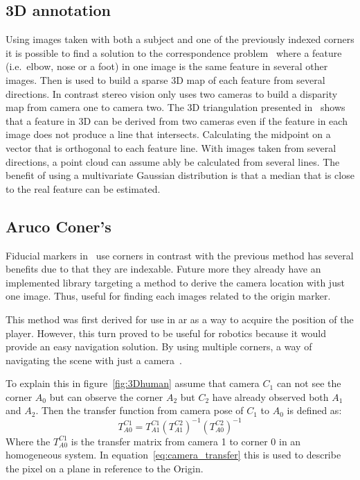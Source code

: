 \subsection{3D annotation}%
\label{sub:3D_anotation}
Using images taken with both a subject and one of the previously indexed corners it is possible to find a solution to the correspondence
problem~\cite{siciliano2010robotics} where a feature (i.e.\ elbow, nose or a foot) in one image is the same feature in several other images.
Then is used to build a sparse 3D map of each feature from several directions.
In contrast stereo vision only uses two cameras to build a disparity map from camera one to camera two.
The 3D triangulation presented in~\cite{zhang2006midpoint} shows that a feature in 3D can be derived from two cameras even if the feature in each image does not produce a line that intersects.
Calculating the midpoint on a vector that is orthogonal to each feature line.
With images taken from several directions, a point cloud can assume ably be calculated from several lines.
The benefit of using a multivariate Gaussian distribution is that a median that is close to the real feature can be estimated.



\subsection{Aruco Coner's}%
\label{sub:ArucoConers}
Fiducial markers in~\cite{romero2018speeded} use \aruco corners in contrast with the previous method has several benefits due to that they are indexable.
Future more they already have an implemented library targeting a method to derive the camera location with just one image.
Thus, useful for finding each images related to the origin \aruco marker.

This method was first derived for use in \ac{ar} as a way to acquire the position of the player.
However, this turn proved to be useful for robotics because it would provide an easy navigation solution.
By using multiple \aruco corners, a way of navigating the scene with just a camera~\cite{zheng2018vlocaruco}.

\par To explain this in figure~\ref{fig:3Dhuman} assume that camera $C_1$ can not see the corner $A_0$ but can observe the corner $A_2$ but $C_2$ have already observed both $A_1$ and $A_2$. Then the transfer function from camera pose of $C_1$ to $A_0$ is defined as:
\begin{equation}
    T^{C1}_{A0} = T^{C1}_{A1} (T^{C2}_{A1})^{-1}(T^{C2}_{A0})^{-1}
\end{equation}
Where the $T^{C1}_{A0}$ is the transfer matrix from camera 1 to \aruco corner 0 in an homogeneous system.
In equation~\ref{eq:camera_transfer} this is used to describe the pixel on a plane in reference to the Origin.

